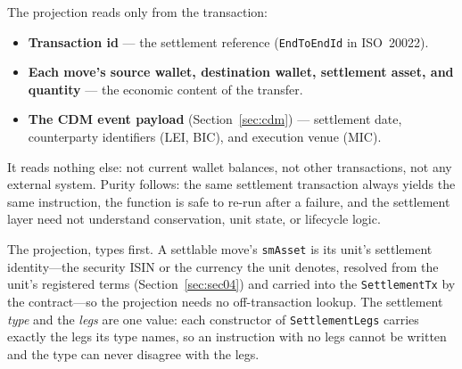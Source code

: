 The projection reads only from the transaction:
\begin{itemize}[nosep]
\item \textbf{Transaction id} --- the settlement reference (\texttt{EndToEndId} in ISO~20022).
\item \textbf{Each move's source wallet, destination wallet, settlement asset, and quantity} --- the economic content of the transfer.
\item \textbf{The CDM event payload} (Section~\ref{sec:cdm}) --- settlement date, counterparty identifiers (LEI, BIC), and execution venue (MIC).
\end{itemize}

It reads nothing else: not current wallet balances, not other transactions, not any external system. Purity follows: the same settlement transaction always yields the same instruction, the function is safe to re-run after a failure, and the settlement layer need not understand conservation, unit state, or lifecycle logic.

The projection, types first. A settlable move's \texttt{smAsset} is its unit's settlement identity---the security ISIN or the currency the unit denotes, resolved from the unit's registered terms (Section~\ref{sec:sec04}) and carried into the \texttt{SettlementTx} by the contract---so the projection needs no off-transaction lookup. The settlement \emph{type} and the \emph{legs} are one value: each constructor of \texttt{SettlementLegs} carries exactly the legs its type names, so an instruction with no legs cannot be written and the type can never disagree with the legs.

